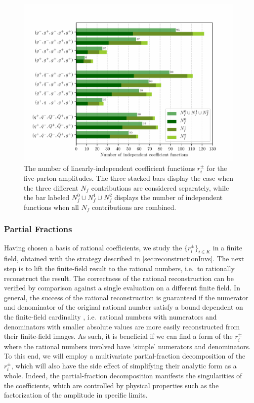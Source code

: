 \begin{figure}[ht]
  \centering
  \includegraphics[width = 1.0\textwidth]{plots/function_space_dimensions.pdf}
  \caption{
    The number of linearly-independent coefficient functions $r_i^\pm$ for the five-parton amplitudes.
    The three stacked bars display the case when the three different $N_f$ contributions are considered separately,
    while the bar labeled $N_f^0\cup N_f^1\cup N_f^2$ displays the number of independent functions
    when all $N_f$ contributions are combined.
  }
  \label{fig:remainderStructure}
\end{figure}


\subsubsection{Partial Fractions}
\label{sec:PartialFractions}

Having chosen a basis of rational coefficients, we study the $\{r_i^\pm\}_{i\in K}$
in a finite field, obtained with the strategy described 
in \cref{sec:reconstructionInvs}.
The next step is to lift the finite-field result to the rational numbers, 
i.e.\  to rationally reconstruct the result. 
The correctness of the rational reconstruction can
be verified by comparison against a single evaluation on a
different finite field. 
In general, the success of the rational reconstruction is
guaranteed if the numerator and denominator of the original rational
number satisfy a bound dependent on the finite-field cardinality
\cite{Wang:1981:PAU:800206.806398, vonManteuffel:2014ixa, Peraro:2016wsq},
i.e.\  rational numbers with numerators and denominators with
smaller absolute values are more easily reconstructed from their finite-field
images. As such, it is beneficial if we can find a form of the
$r_i^\pm$ where the rational numbers involved have `simple' numerators and
denominators. 
To this end, we will employ a multivariate partial-fraction decomposition
of the $r_i^\pm$, which will also have the side effect of simplifying their
analytic form as a whole. 
Indeed, the partial-fraction decomposition manifests the singularities
of the coefficients, which are controlled by physical properties such
as the factorization of the amplitude in specific limits.


